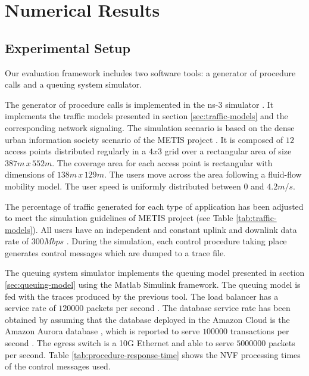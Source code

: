\documentclass[conference]{IEEEtran}
\begin{document}
\section{Numerical Results}
\label{sec:numerical-results}
\subsection{Experimental Setup}

Our evaluation framework includes two software tools: a generator of procedure calls and a queuing system simulator.

The generator of procedure calls is implemented in the ns-3 simulator \cite{ns3}. It implements the traffic models presented in section \ref{sec:traffic-models} and the corresponding network signaling. The simulation scenario is based on the dense urban information society scenario of the METIS project \cite{metis}. It is composed of $12$ access points distributed regularly in a $4 x 3$ grid over a rectangular area of size $387m\,x\,552m$. The coverage area for each access point is rectangular with dimensions of $138m\,x\,129m$. The users move across the area following a fluid-flow mobility model.
The user speed is uniformly distributed between $0$ and $4.2m/s$.

The percentage of traffic generated for each type of application has been adjusted to meet the simulation guidelines of METIS project (see Table \ref{tab:traffic-models}). All users have an independent and constant uplink and downlink data rate of $300Mbps$ \cite{metis}. During the simulation, each control procedure taking place generates control messages which are dumped to a trace file. 

The queuing system simulator implements the queuing model presented in section \ref{sec:queuing-model} using the Matlab Simulink framework. The queuing model is fed with the traces produced by the previous tool. The load balancer has a service rate of $120000$ packets per second \cite{rightscal}.  The database service rate has been obtained by assuming that the database deployed in the Amazon Cloud is the Amazon Aurora database \cite{amazon-ec2}, which is reported to serve $100000$ transactions per second \cite{aurora-benchmark-2015}. The egress switch is a 10G Ethernet and able to serve $5000000$ packets per second. Table \ref{tab:procedure-response-time} shows the NVF processing times of the control messages used.
\end{document}
